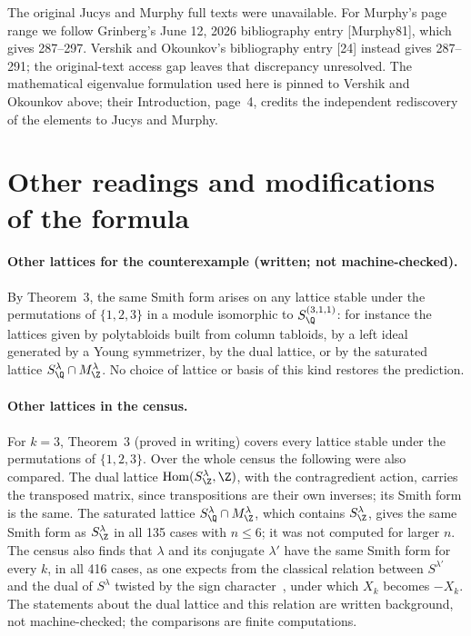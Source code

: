 The original Jucys and Murphy full texts were unavailable. For Murphy's page range we follow Grinberg's June 12, 2026 bibliography entry [Murphy81], which gives 287--297. Vershik and Okounkov's bibliography entry [24] instead gives 287--291; the original-text access gap leaves that discrepancy unresolved. The mathematical eigenvalue formulation used here is pinned to Vershik and Okounkov above; their Introduction, page~4, credits the independent rediscovery of the elements to Jucys and Murphy.

\section{Other readings and modifications of the formula}\label{app:readings}\label{sec:readings}

\paragraph{Other lattices for the counterexample (written; not machine-checked).} By
Theorem~3, the same Smith form arises on any lattice stable under
the permutations of $\{1,2,3\}$ in a module isomorphic to $S^{(3,1,1)}_\Q$:
for instance the lattices given by polytabloids built from column tabloids,
by a left ideal generated by a Young symmetrizer, by the dual lattice, or by
the saturated lattice $S^\lambda_\Q\cap M^\lambda_\Z$. No choice of lattice
or basis of this kind restores the prediction.


\paragraph{Other lattices in the census.} For $k=3$, Theorem~3 (proved in
writing) covers every lattice stable under the permutations of
$\{1,2,3\}$. Over the whole census the following were also compared. The
dual lattice
$\operatorname{Hom}(S^\lambda_\Z,\Z)$, with the contragredient action,
carries the transposed matrix, since transpositions are their own inverses;
its Smith form is the same. The saturated lattice
$S^\lambda_\Q\cap M^\lambda_\Z$, which contains $S^\lambda_\Z$, gives the
same Smith form as $S^\lambda_\Z$ in all 135 cases with $n\le6$; it was not
computed for larger $n$. The census also finds that $\lambda$ and its
conjugate $\lambda'$ have the same Smith form for every $k$, in all 416 cases,
as one expects from the classical relation between $S^{\lambda'}$ and the
dual of $S^\lambda$ twisted by the sign character~\cite[\S8]{james}, under
which $X_k$ becomes $-X_k$. The statements about the dual lattice and this
relation are written background, not machine-checked; the comparisons are
finite computations.


